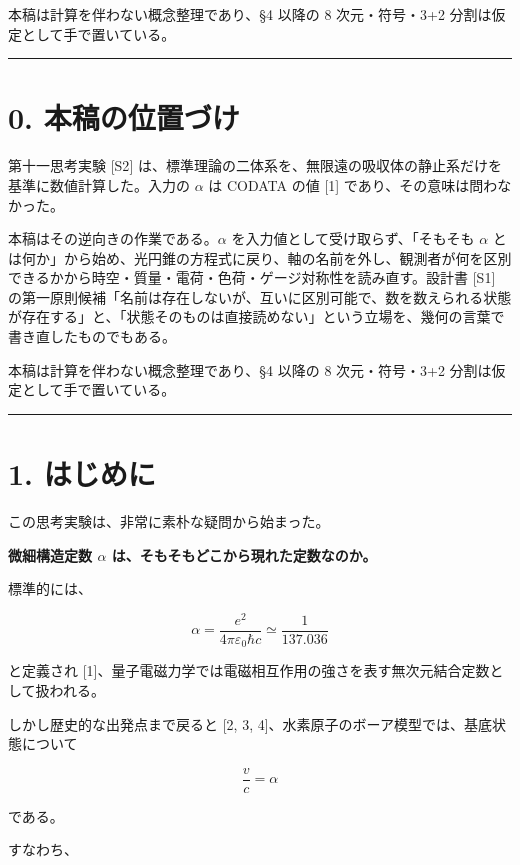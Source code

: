 \documentclass[
  a4paper,
]{ltjsarticle}
\begin{document}
本稿は計算を伴わない概念整理であり、§4 以降の 8 次元・符号・3+2
分割は仮定として手で置いている。

\begin{center}\rule{0.5\linewidth}{0.5pt}\end{center}

\section{0.
本稿の位置づけ}\label{ux672cux7a3fux306eux4f4dux7f6eux3065ux3051}

第十一思考実験 {[}S2{]}
は、標準理論の二体系を、無限遠の吸収体の静止系だけを基準に数値計算した。入力の
\(\alpha\) は CODATA の値 {[}1{]} であり、その意味は問わなかった。

本稿はその逆向きの作業である。\(\alpha\)
を入力値として受け取らず、「そもそも \(\alpha\)
とは何か」から始め、光円錐の方程式に戻り、軸の名前を外し、観測者が何を区別できるかから時空・質量・電荷・色荷・ゲージ対称性を読み直す。設計書
{[}S1{]}
の第一原則候補「名前は存在しないが、互いに区別可能で、数を数えられる状態が存在する」と、「状態そのものは直接読めない」という立場を、幾何の言葉で書き直したものでもある。

本稿は計算を伴わない概念整理であり、§4 以降の 8 次元・符号・3+2
分割は仮定として手で置いている。

\begin{center}\rule{0.5\linewidth}{0.5pt}\end{center}

\section{1. はじめに}\label{ux306fux3058ux3081ux306b}

この思考実験は、非常に素朴な疑問から始まった。

\textbf{微細構造定数 \(\alpha\) は、そもそもどこから現れた定数なのか。}

標準的には、

\[
\alpha=
\frac{e^2}{4\pi\varepsilon_0\hbar c}
\simeq\frac{1}{137.036}
\]

と定義され
{[}1{]}、量子電磁力学では電磁相互作用の強さを表す無次元結合定数として扱われる。

しかし歴史的な出発点まで戻ると {[}2, 3,
4{]}、水素原子のボーア模型では、基底状態について

\[
\frac{v}{c}=\alpha
\]

である。

すなわち、
\end{document}
